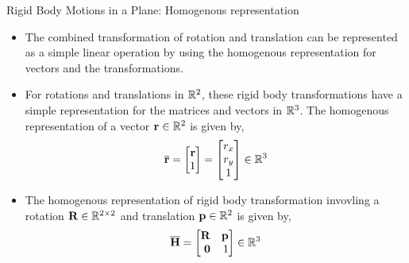 \documentclass[aspectratio=169]{beamer}
\begin{document}
\begin{frame}{Rigid Body Motions in a Plane: Homogenous representation}
  \begin{itemize}
    \item The combined transformation of rotation and translation can be represented as a simple linear operation by using the homogenous representation for vectors and the transformations.
    \item For rotations and translations in $\mathbb{R}^2$, these rigid body transformations have a simple representation for the matrices and vectors in $\mathbb{R}^3$. The homogenous representation of a vector $\mathbf{r} \in \mathbb{R}^2$ is given by,
    \[ \overline{\mf{r}} = \bmx \mf{r} \\ 1\emx = \bmxc r_x \\ r_y \\ 1\emx \in \mb{R}^3\]
    \item The homogenous representation of rigid body transformation invovling a rotation $\mathbf{R} \in \mathbb{R}^{2 \times 2}$ and translation $\mathbf{p} \in \mathbb{R}^2$ is given by,
    \[ \overline{\mf{H}} = \bmx \mf{R} & \mf{p} \\ \mf{0} & 1 \emx \in \mb{R}^3 \]
  \end{itemize}
\end{frame}
\end{document}
